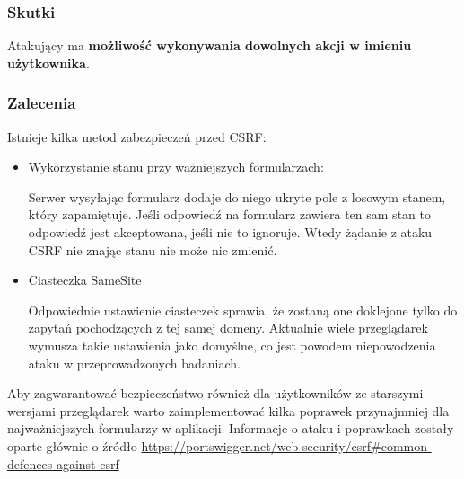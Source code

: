 \subsubsection{Skutki}
Atakujący ma \textbf{możliwość wykonywania dowolnych akcji w imieniu użytkownika}.

\subsubsection{Zalecenia}
Istnieje kilka metod zabezpieczeń przed CSRF:
\begin{itemize}
  \item Wykorzystanie stanu przy ważniejszych formularzach:
  
  Serwer wysyłając formularz dodaje do niego ukryte pole z losowym stanem, który zapamiętuje. Jeśli odpowiedź na formularz zawiera ten sam stan to odpowiedź jest akceptowana, jeśli nie to ignoruje. Wtedy żądanie z ataku CSRF nie znając stanu nie może nic zmienić.
  \item Ciasteczka SameSite
  
  Odpowiednie ustawienie ciasteczek sprawia, że zostaną one doklejone tylko do zapytań pochodzących z tej samej domeny. Aktualnie wiele przeglądarek wymusza takie ustawienia jako domyślne, co jest powodem niepowodzenia ataku w przeprowadzonych badaniach.
\end{itemize}
Aby zagwarantować bezpieczeństwo również dla użytkowników ze starszymi wersjami przeglądarek warto zaimplementować kilka poprawek przynajmniej dla najważniejszych formularzy w aplikacji. Informacje o ataku i poprawkach zostały oparte głównie o źródło \href{https://portswigger.net/web-security/csrf\#common-defences-against-csrf}{https://portswigger.net/web-security/csrf\#common-defences-against-csrf}
  
